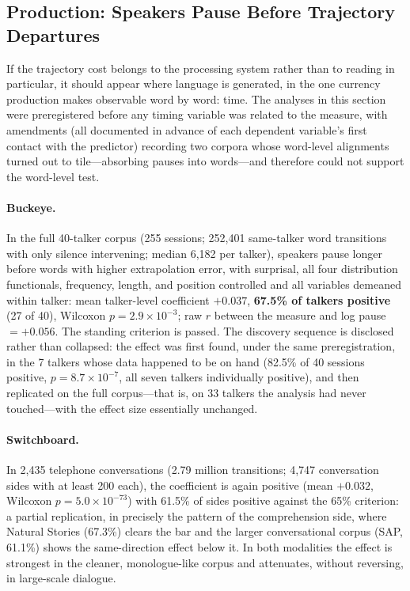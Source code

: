 \documentclass[12pt]{article}
\newcommand{\new}[1]{#1}   %
\begin{document}
\FloatBarrier

\new{\subsection{Production: Speakers Pause Before Trajectory Departures}\label{sec:production}

If the trajectory cost belongs to the processing system rather than to reading in particular, it should appear where language is generated, in the one currency production makes observable word by word: time. The analyses in this section were preregistered before any timing variable was related to the measure, with amendments (all documented in advance of each dependent variable's first contact with the predictor) recording two corpora whose word-level alignments turned out to tile---absorbing pauses into words---and therefore could not support the word-level test.

\paragraph{Buckeye.} In the full 40-talker corpus (255 sessions; 252,401 same-talker word transitions with only silence intervening; median 6,182 per talker), speakers pause longer before words with higher extrapolation error, with surprisal, all four distribution functionals, frequency, length, and position controlled and all variables demeaned within talker: mean talker-level coefficient $+0.037$, \textbf{67.5\% of talkers positive} (27 of 40), Wilcoxon $p = 2.9 \times 10^{-3}$; raw $r$ between the measure and log pause $= +0.056$. The standing criterion is passed. The discovery sequence is disclosed rather than collapsed: the effect was first found, under the same preregistration, in the 7 talkers whose data happened to be on hand (82.5\% of 40 sessions positive, $p = 8.7 \times 10^{-7}$, all seven talkers individually positive), and then replicated on the full corpus---that is, on 33 talkers the analysis had never touched---with the effect size essentially unchanged.

\paragraph{Switchboard.} In 2,435 telephone conversations (2.79 million transitions; 4,747 conversation sides with at least 200 each), the coefficient is again positive (mean $+0.032$, Wilcoxon $p = 5.0 \times 10^{-73}$) with 61.5\% of sides positive against the 65\% criterion: a partial replication, in precisely the pattern of the comprehension side, where Natural Stories (67.3\%) clears the bar and the larger conversational corpus (SAP, 61.1\%) shows the same-direction effect below it. In both modalities the effect is strongest in the cleaner, monologue-like corpus and attenuates, without reversing, in large-scale dialogue.

}
\end{document}
